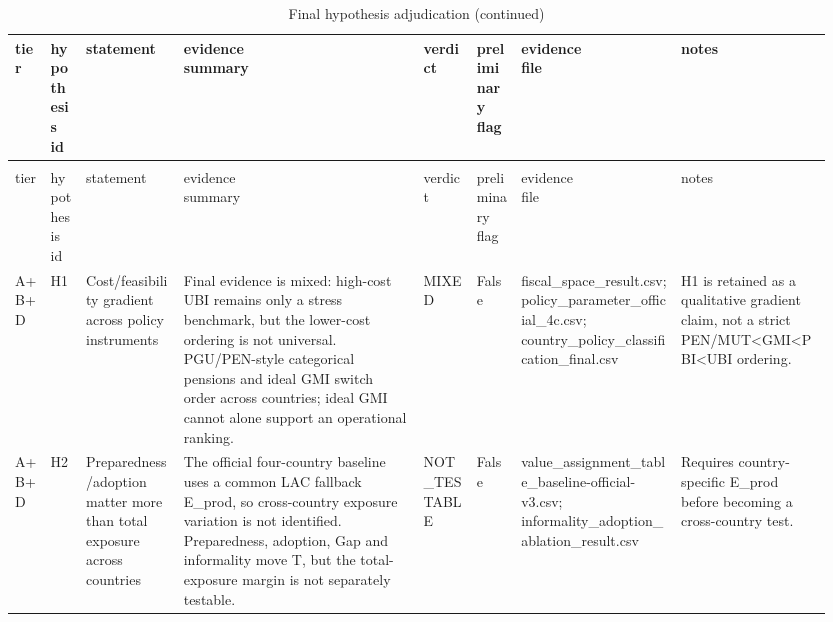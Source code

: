 \begin{landscape}
\fontsize{6.3}{7.6}\selectfont
\setlength{\tabcolsep}{1pt}
\setlength{\LTleft}{0pt}
\setlength{\LTright}{0pt}
\let\tableunderscore\_
\renewcommand{\_}{\tableunderscore\allowbreak}
\begin{longtable}{@{}
>{\raggedright\arraybackslash}p{0.045\linewidth}
>{\raggedright\arraybackslash}p{0.04\linewidth}
>{\raggedright\arraybackslash}p{0.115\linewidth}
>{\raggedright\arraybackslash}p{0.275\linewidth}
>{\raggedright\arraybackslash}p{0.065\linewidth}
>{\raggedright\arraybackslash}p{0.055\linewidth}
>{\raggedright\arraybackslash}p{0.185\linewidth}
>{\raggedright\arraybackslash}p{0.17\linewidth}@{}}
\caption{Final hypothesis adjudication}\label{tab:results_adjudication}\\
\toprule
tier & \shortstack{hypothesis\\id} & statement & \shortstack{evidence\\summary} & verdict & \shortstack{preliminary\\flag} & \shortstack{evidence\\file} & notes \\
\midrule
\endfirsthead
\caption[]{Final hypothesis adjudication (continued)}\\
\toprule
tier & \shortstack{hypothesis\\id} & statement & \shortstack{evidence\\summary} & verdict & \shortstack{preliminary\\flag} & \shortstack{evidence\\file} & notes \\
\midrule
\endhead
A+B+D & H1 & Cost/feasibility gradient across policy instruments & Final evidence is mixed: high-cost UBI remains only a stress benchmark, but the lower-cost ordering is not universal. PGU/PEN-style categorical pensions and ideal GMI switch order across countries; ideal GMI cannot alone support an operational ranking. & MIXED & False & fiscal\_space\_result.csv; policy\_parameter\_official\_4c.csv; country\_policy\_classification\_final.csv & H1 is retained as a qualitative gradient claim, not a strict PEN/MUT<GMI<PBI<UBI ordering. \\
A+B+D & H2 & Preparedness/adoption matter more than total exposure across countries & The official four-country baseline uses a common LAC fallback E\_prod, so cross-country exposure variation is not identified. Preparedness, adoption, Gap and informality move T, but the total-exposure margin is not separately testable. & NOT\_TESTABLE & False & value\_assignment\_table\_baseline-official-v3.csv; informality\_adoption\_ablation\_result.csv & Requires country-specific E\_prod before becoming a cross-country test. \\

\end{longtable}
\end{landscape}
